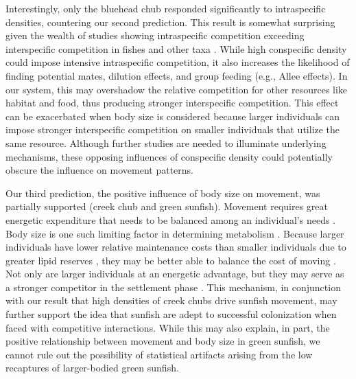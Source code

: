 \documentclass[11pt, class=article, crop=false]{standalone}
\begin{document}
Interestingly, only the bluehead chub responded significantly to intraspecific densities, countering our second prediction. This result is somewhat surprising given the wealth of studies showing intraspecific competition exceeding interspecific competition in fishes \citep{websterMechanismsIndividualConsequences2000, wardIntraspecificFoodCompetition2006} and other taxa \citep{adlerCompetitionCoexistencePlant2018, barabasEffectIntraInterspecific2016, thompsonProcessbasedMetacommunityFramework2020, chessonRolesHarshFluctuating1997, tilmanResourceCompetitionCommunity1982, mcpeekIntraspecificDensityDependence2012}. While high conspecific density could impose intensive intraspecific competition, it also increases the likelihood of finding potential mates, dilution effects, and group feeding (e.g., Allee effects)\citep{courchampAlleeEffectsEcology2008, gascoigneAlleeEffectsDriven2004, teruiCrypticAlleeEffect2015}. In our system, this may overshadow the relative competition for other resources like habitat and food, thus producing stronger interspecific competition. This effect can be exacerbated when body size is considered because larger individuals can impose stronger interspecific competition on smaller individuals that utilize the same resource. Although further studies are needed to illuminate underlying mechanisms, these opposing influences of conspecific density could potentially obscure the influence on movement patterns. 

Our third prediction, the positive influence of body size on movement, was partially supported (creek chub and green sunfish). Movement requires great energetic expenditure that needs to be balanced among an individual’s needs \citep{boisclairImportanceActivityBioenergetics1989, joblingBioenergeticsFeedIntake1993, cookeMovementEcologyFishes2022}. Body size is one such limiting factor in determining metabolism \citep{beamish2SwimmingCapacity1978, rubio-graciaSizerelatedEffectsInfluence2020}. Because larger individuals have lower relative maintenance costs than smaller individuals due to greater lipid reserves \citep{brownSizeMattersTest2004, krauseRefugeUseFish1998, kannoBodyConditionMetrics}, they may be better able to balance the cost of moving \citep{schlagelMovementmediatedCommunityAssembly2020}. Not only are larger individuals at an energetic advantage, but they may serve as a stronger competitor in the settlement phase \citep{rasmussenIndividualMovementStream2017}. This mechanism, in conjunction with our result that high densities of creek chubs drive sunfish movement, may further support the idea that sunfish are adept to successful colonization when faced with competitive interactions. While this may also explain, in part, the positive relationship between movement and body size in green sunfish, we cannot rule out the possibility of statistical artifacts arising from the low recaptures of larger-bodied green sunfish. 
\end{document}
